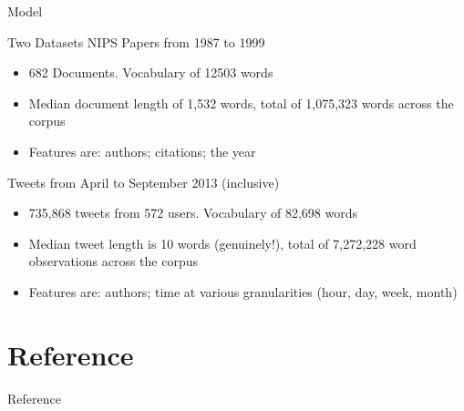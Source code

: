 \documentclass[xcolor=dvipsnames]{beamer}
\begin{document}
\begin{frame}{Model}

Two Datasets
NIPS Papers from 1987 to 1999
\begin{itemize}
    \item 682 Documents. Vocabulary of 12503 words
    \item Median document length of 1,532 words, total of 1,075,323 words across the corpus
    \item Features are: authors; citations; {\color{gray} the year}
\end{itemize}

Tweets from April to September 2013 (inclusive)
\begin{itemize}
    \item 735,868 tweets from 572 users. Vocabulary of 82,698 words
    \item Median tweet length is 10 words (genuinely!), total of 7,272,228 word observations across the corpus 
    \item Features are: authors; time at various granularities (hour, day, week, month)
\end{itemize}

\end{frame}








\section{Reference}
\begin{frame}[allowframebreaks]{Reference}






\end{frame}
\end{document}
